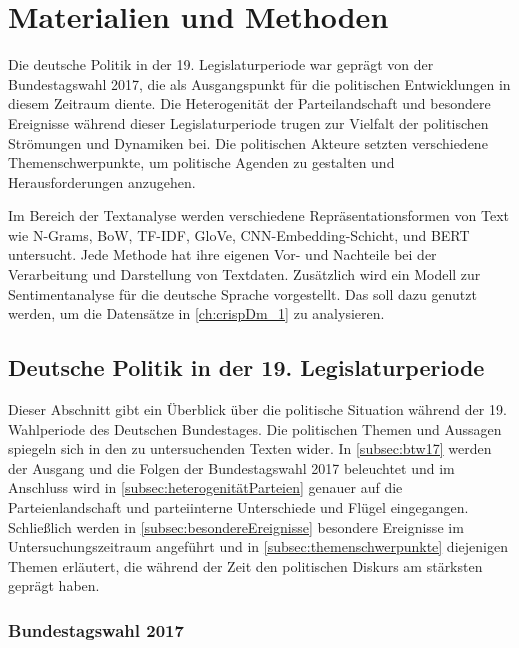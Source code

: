 
\chapter{Materialien und Methoden} \label{ch:materialsAndMethods}

Die deutsche Politik in der 19. Legislaturperiode war geprägt von der Bundestagswahl 2017, die als Ausgangspunkt für die politischen Entwicklungen in diesem Zeitraum diente. Die Heterogenität der Parteilandschaft und besondere Ereignisse während dieser Legislaturperiode trugen zur Vielfalt der politischen Strömungen und Dynamiken bei. Die politischen Akteure setzten verschiedene Themenschwerpunkte, um politische Agenden zu gestalten und Herausforderungen anzugehen.

Im Bereich der Textanalyse werden verschiedene Repräsentationsformen von Text wie N-Grams, \ac{BoW}, \ac{TF-IDF}, \ac{GloVe}, \ac{CNN}-Embedding-Schicht, \ft und \ac{BERT} untersucht. Jede Methode hat ihre eigenen Vor- und Nachteile bei der Verarbeitung und Darstellung von Textdaten. Zusätzlich wird ein Modell zur Sentimentanalyse für die deutsche Sprache vorgestellt. Das soll dazu genutzt werden, um die Datensätze in \autoref{ch:crispDm_1} zu analysieren.

\section{Deutsche Politik in der 19. Legislaturperiode}

Dieser Abschnitt gibt ein Überblick über die politische Situation während der \num{19}. Wahlperiode des Deutschen Bundestages. Die politischen Themen und Aussagen spiegeln sich in den zu untersuchenden Texten wider. In \autoref{subsec:btw17} werden der Ausgang und die Folgen der Bundestagswahl \num{2017} beleuchtet und im Anschluss wird in \autoref{subsec:heterogenitätParteien} genauer auf die Parteienlandschaft und parteiinterne Unterschiede und Flügel eingegangen. Schließlich werden in \autoref{subsec:besondereEreignisse} besondere Ereignisse im Untersuchungszeitraum angeführt und in \autoref{subsec:themenschwerpunkte} diejenigen Themen erläutert, die während der Zeit den politischen Diskurs am stärksten geprägt haben.

\subsection{Bundestagswahl \num{2017}} \label{subsec:btw17}

